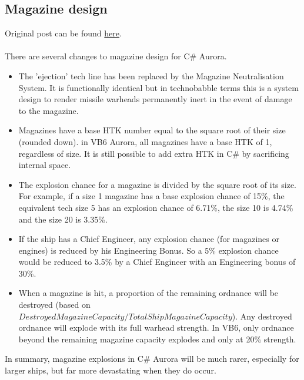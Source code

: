 \documentclass[../../Aurora C# unofficial manual.tex]{subfiles}
\begin{document}
		\subsection{Magazine design}
	Original post can be found
	\href{http://aurora2.pentarch.org/index.php?topic=8495.msg107372#msg107372}{here}.
	\\\\
	
	There are several changes to magazine design for C\# Aurora.
	\begin{itemize}
		\item The 'ejection' tech line has been replaced by the Magazine Neutralisation System. It is functionally identical but in technobabble terms this is a system design to render missile warheads permanently inert in the event of damage to the magazine.
		\item Magazines have a base HTK number equal to the square root of their size (rounded down). in VB6 Aurora, all magazines have a base HTK of 1, regardless of size. It is still possible to add extra HTK in C\# by sacrificing internal space.
		\item The explosion chance for a magazine is divided by the square root of its size. For example, if a size 1 magazine has a base explosion chance of 15\%, the equivalent tech size 5 has an explosion chance of 6.71\%, the size 10 is 4.74\% and the size 20 is 3.35\%.
		\item If the ship has a Chief Engineer, any explosion chance (for magazines or engines) is reduced by his Engineering Bonus. So a 5\% explosion chance would be reduced to 3.5\% by a Chief Engineer with an Engineering bonus of 30\%.
		\item When a magazine is hit, a proportion of the remaining ordnance will be destroyed (based on\\ \( Destroyed Magazine Capacity / Total Ship Magazine Capacity \)). Any destroyed ordnance will explode with its full warhead strength.  In VB6, only ordnance beyond the remaining magazine capacity explodes and only at 20\% strength.
	\end{itemize}	
	In summary, magazine explosions in C\# Aurora will be much rarer, especially for larger ships, but far more devastating when they do occur.
\end{document}
